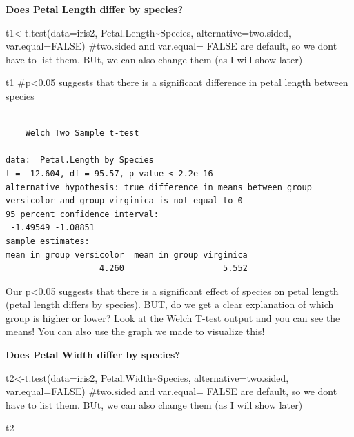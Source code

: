 \documentclass[
  letterpaper,
  DIV=11,
  numbers=noendperiod]{scrartcl}
\newenvironment{Shaded}{\begin{snugshade}}{\end{snugshade}}
\newcommand{\AttributeTok}[1]{\textcolor[rgb]{0.40,0.45,0.13}{#1}}
\newcommand{\CommentTok}[1]{\textcolor[rgb]{0.37,0.37,0.37}{#1}}
\newcommand{\ConstantTok}[1]{\textcolor[rgb]{0.56,0.35,0.01}{#1}}
\newcommand{\FunctionTok}[1]{\textcolor[rgb]{0.28,0.35,0.67}{#1}}
\newcommand{\NormalTok}[1]{\textcolor[rgb]{0.00,0.23,0.31}{#1}}
\newcommand{\OtherTok}[1]{\textcolor[rgb]{0.00,0.23,0.31}{#1}}
\newcommand{\SpecialCharTok}[1]{\textcolor[rgb]{0.37,0.37,0.37}{#1}}
\newcommand{\StringTok}[1]{\textcolor[rgb]{0.13,0.47,0.30}{#1}}
\begin{document}
\textbf{Does Petal Length differ by species?}

\begin{Shaded}
\begin{Highlighting}[]
\NormalTok{t1}\OtherTok{\textless{}{-}}\FunctionTok{t.test}\NormalTok{(}\AttributeTok{data=}\NormalTok{iris2, Petal.Length}\SpecialCharTok{\textasciitilde{}}\NormalTok{Species, }\AttributeTok{alternative=}\StringTok{\textquotesingle{}two.sided\textquotesingle{}}\NormalTok{, }\AttributeTok{var.equal=}\ConstantTok{FALSE}\NormalTok{) }\CommentTok{\#two.sided and var.equal= FALSE are default, so we don\textquotesingle{}t have to list them. BUt, we can also change them (as I will show later)}

\NormalTok{t1 }\CommentTok{\#p\textless{}0.05 suggests that there is a significant difference in petal length between species}
\end{Highlighting}
\end{Shaded}

\begin{verbatim}

    Welch Two Sample t-test

data:  Petal.Length by Species
t = -12.604, df = 95.57, p-value < 2.2e-16
alternative hypothesis: true difference in means between group versicolor and group virginica is not equal to 0
95 percent confidence interval:
 -1.49549 -1.08851
sample estimates:
mean in group versicolor  mean in group virginica 
                   4.260                    5.552 
\end{verbatim}

\hfill\break
Our p\textless0.05 suggests that there is a significant effect of
species on petal length (petal length differs by species). BUT, do we
get a clear explanation of which group is higher or lower? Look at the
Welch T-test output and you can see the means! You can also use the
graph we made to visualize this!

\textbf{Does Petal Width differ by species?}

\begin{Shaded}
\begin{Highlighting}[]
\NormalTok{t2}\OtherTok{\textless{}{-}}\FunctionTok{t.test}\NormalTok{(}\AttributeTok{data=}\NormalTok{iris2, Petal.Width}\SpecialCharTok{\textasciitilde{}}\NormalTok{Species, }\AttributeTok{alternative=}\StringTok{\textquotesingle{}two.sided\textquotesingle{}}\NormalTok{, }\AttributeTok{var.equal=}\ConstantTok{FALSE}\NormalTok{) }\CommentTok{\#two.sided and var.equal= FALSE are default, so we don\textquotesingle{}t have to list them. BUt, we can also change them (as I will show later)}

\NormalTok{t2}
\end{Highlighting}
\end{Shaded}
\end{document}
